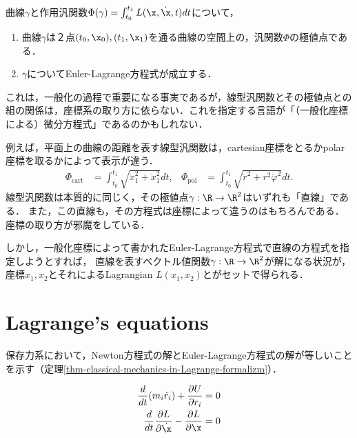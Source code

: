 \documentclass[uplatex, 12pt, dvipdfmx]{jsreport}
\begin{document}
\begin{theorem}
    曲線$\gamma$と作用汎関数$\Phi(\gamma)=\int^{t_1}_{t_0}L(\x,\dot{\x},t)dt$について，
    \begin{enumerate}
        \item 曲線$\gamma$は２点$(t_0,\x_0),(t_1,\x_1)$を通る曲線の空間上の，汎関数$\Phi$の極値点である．
        \item $\gamma$についてEuler-Lagrange方程式が成立する．
    \end{enumerate}
\end{theorem}
\begin{remark}\label{remark-generalized-coordinates}
    これは，一般化の過程で重要になる事実であるが，線型汎関数とその極値点との組の関係は，座標系の取り方に依らない．これを指定する言語が「（一般化座標による）微分方程式」であるのかもしれない．

    例えば，平面上の曲線の距離を表す線型汎関数は，cartesian座標をとるかpolar座標を取るかによって表示が違う．
    \begin{align*}
        \Phi_{\mathrm{cart}}&=\int^{t_1}_{t_0}\sqrt{\dot{x}_1^2+\dot{x}_1^2}dt, &\Phi_{\mathrm{pol}}&=\int^{t_1}_{t_0}\sqrt{\dot{r}^2+r^2\dot{\varphi}^2}dt.
    \end{align*}
    線型汎関数は本質的に同じく，その極値点$\gamma:\R\to\R^2$はいずれも「直線」である．
    また，この直線も，その方程式は座標によって違うのはもちろんである．
    座標の取り方が邪魔をしている．

    しかし，一般化座標によって書かれたEuler-Lagrange方程式で直線の方程式を指定しようとすれば，
    直線を表すベクトル値関数$\gamma:\R\to\R^2$が解になる状況が，
    座標$x_1,x_2$とそれによるLagrangian $L(x_1,x_2)$とがセットで得られる．
\end{remark}

\section{Lagrange's equations}

\begin{screen}
    保存力系において，Newton方程式の解とEuler-Lagrange方程式の解が等しいことを示す（定理\ref{thm-classical-mechanics-in-Lagrange-formalizm}）．
\end{screen}

\begin{align}
    \frac{d}{dt}(m_i\dot{r}_i)+\frac{\partial U}{\partial r_i}=0 \label{equation-Newton}\\
    \frac{d}{dt}\frac{\partial L}{\partial\dot{\x}}-\frac{\partial L}{\partial\x}=0 \label{equation-Lagrange}
\end{align}
\end{document}
